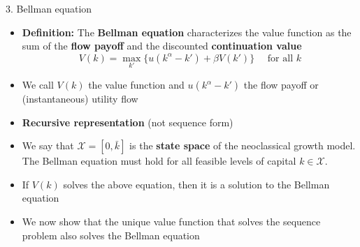\documentclass[10pt]{beamer}
\begin{document}
\begin{frame}{3. Bellman equation}
\begin{itemize}
\item \textbf{Definition:} The \textbf{Bellman equation} characterizes the value function as the sum of the \textbf{flow payoff} and the discounted \textbf{continuation value}
\begin{equation*}
	V(k) = \max_{k'} \Big\{ u(k^\alpha - k') + \beta V(k') \Big\} \quad \text{ for all } k
\end{equation*}

\item We call $V(k)$ the value function and $u(k^\alpha - k')$ the flow payoff or (instantaneous) utility flow

\item \textbf{Recursive representation} (not sequence form)

\item We say that $\mathcal X = [0, \bar k]$ is the \textbf{state space} of the neoclassical growth model. The Bellman equation must hold for all feasible levels of capital $k \in \mathcal X$.

\item If $V(k)$ solves the above equation, then it is a solution to the Bellman equation

\item We now show that the unique value function that solves the sequence problem also solves the Bellman equation

\end{itemize}
\end{frame}
\end{document}
